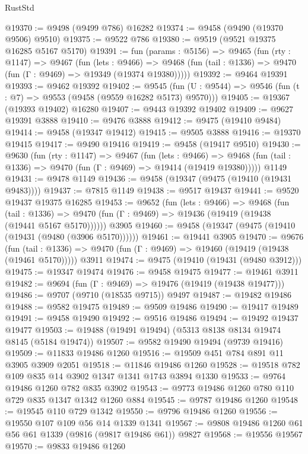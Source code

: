 \begin{lexlean}{RustStd}
\begin{coremodule}
@19370 := @9498 (@9499 @786) @16282
@19374 := @9458 (@9490 (@19370 @9506) @9510)
@19375 := @9522 @786
@19380 := @9519 (@9521 @19375 @16285 @5167 @5170)
@19391 := fun (params : @5156) =>
  @9465
    (fun (rty : @1147) =>
    @9467
      (fun (lets : @9466) =>
      @9468 (fun (tail : @1336) => @9470 (fun (Γ : @9469) => @19349 (@19374 @19380)))))
@19392 := @9464 @19391
@19393 := @9462 @19392
@19402 := @9545
    (fun (U : @9544) => @9546 (fun (t : @7) => @9553 (@9458 (@9559 @16282 @5173) @9570)))
@19405 := @19367 (@19393 @19402) @16280
@19407 := @9443 @19392 @19402
@19409 := @9627 @19391 @3888
@19410 := @9476 @3888
@19412 := @9475 (@19410 @9484)
@19414 := @9458 (@19347 @19412)
@19415 := @9505 @3888
@19416 := @19370 @19415
@19417 := @9490 @19416
@19419 := @9458 (@19417 @9510)
@19430 := @9630
    (fun (rty : @1147) =>
    @9467
      (fun (lets : @9466) =>
      @9468 (fun (tail : @1336) => @9470 (fun (Γ : @9469) => @19414 (@19419 @19380)))))
    @1149
@19431 := @9478 @1149
@19436 := @9458 (@19347 (@9475 (@19410 (@19431 @9483))))
@19437 := @7815 @1149
@19438 := @9517 @19437
@19441 := @9520 @19437 @19375 @16285
@19453 := @9652
    (fun (lets : @9466) =>
    @9468
      (fun (tail : @1336) =>
      @9470 (fun (Γ : @9469) => @19436 (@19419 (@19438 (@19441 @5167 @5170))))))
    @3905
@19460 := @9458 (@19347 (@9475 (@19410 (@19431 (@9480 (@3906 @5170))))))
@19461 := @19441 @3905
@19470 := @9676
    (fun (tail : @1336) => @9470 (fun (Γ : @9469) => @19460 (@19419 (@19438 (@19461 @5170)))))
    @3911
@19474 := @9475 (@19410 (@19431 (@9480 @3912)))
@19475 := @19347 @19474
@19476 := @9458 @19475
@19477 := @19461 @3911
@19482 := @9694 (fun (Γ : @9469) => @19476 (@19419 (@19438 @19477)))
@19486 := @9707 (@9710 (@18535 @9715)) @9497
@19487 := @19482 @19486
@19488 := @9582 @19475
@19489 := @9509 @19486
@19490 := @19417 @19489
@19491 := @9458 @19490
@19492 := @9516 @19486
@19494 := @19492 @19437 @19477
@19503 := @19488 (@19491 @19494) (@5313 @8138 @8134 @19474 @8145 (@5184 @19474))
@19507 := @9582 @19490 @19494 (@9739 @19416)
@19509 := @11833 @19486 @1260
@19516 := @19509 @451 @784 @891 @11 @3905 @3909 @2051
@19518 := @11846 @19486 @1260
@19528 := @19518 @782 @109 @835 @14 @3902 @1347 @1341 @1743 @3894 @1330
@19533 := @9764 @19486 @1260 @782 @835 @3902
@19543 := @9773 @19486 @1260 @780 @110 @729 @835 @1347 @1342 @1260 @884
@19545 := @9787 @19486 @1260
@19548 := @19545 @110 @729 @1342
@19550 := @9796 @19486 @1260
@19556 := @19550 @107 @109 @56 @14 @1339 @1341
@19567 := @9808 @19486 @1260 @61 @56 @61 @1339 (@9816 (@9817 @19486 @61)) @9827
@19568 := @19556 @19567
@19570 := @9833 @19486 @1260

\end{coremodule}
\end{lexlean}
